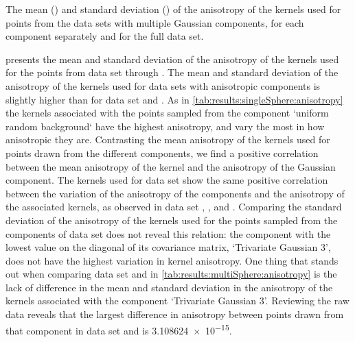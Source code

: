 	\begin{table*}
		\centering
		
		\caption{The mean (\mean) and standard deviation (\SD) of the anisotropy of the kernels used for points from the data sets with multiple Gaussian components, for each component separately and for the full data set.} 	
		\label{tab:results:multiSphere:anisotropy}
	\end{table*}
	 presents the mean and standard deviation of the anisotropy of the kernels used for the points from data set \ferdosiTwo through \baakmanThree.
	The mean and standard deviation of the anisotropy of the kernels used for data sets with anisotropic components is slightly higher than for data set \ferdosiTwo and \ferdosiThree.
	As in \cref{tab:results:singleSphere:anisotropy} the kernels associated with the points sampled from the component `uniform random background` have the highest anisotropy, and vary the most in how anisotropic they are. 
	Contrasting the mean anisotropy of the kernels used for points drawn from the different components, we find a positive correlation between the mean anisotropy of the kernel and the anisotropy of the Gaussian component. 
		The kernels used for data set \baakmanTwo show the same positive correlation between the variation of the anisotropy of the components and the anisotropy of the associated kernels, as observed in data set \baakmanOne, \baakmanFour, and \baakmanFive. 
		Comparing the standard deviation of the anisotropy of the kernels used for the points sampled from the components of data set \baakmanThree does not reveal this relation: the component with the lowest value on the diagonal of its covariance matrix, `Trivariate Gaussian 3', does not have the highest variation in kernel anisotropy. 
	One thing that stands out when comparing data set \ferdosiThree and \baakmanThree in \cref{tab:results:multiSphere:anisotropy} is the lack of difference in the mean and standard deviation in the anisotropy of the kernels associated with the component `Trivariate Gaussian 3'. Reviewing the raw data reveals that the largest difference in anisotropy between points drawn from that component in data set \ferdosiThree and \baakmanThree is \num{3.108624e-15}.

